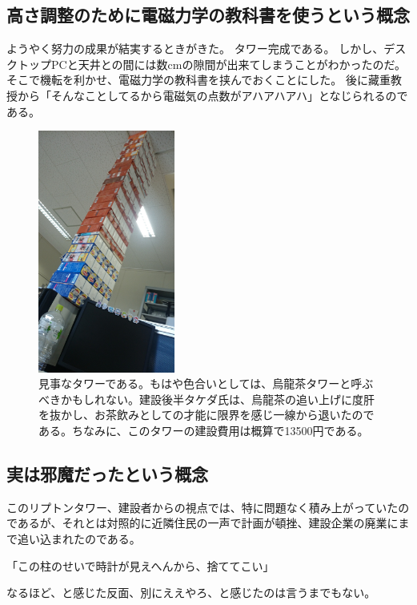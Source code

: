 \subsection{高さ調整のために電磁力学の教科書を使うという概念}
ようやく努力の成果が結実するときがきた。
タワー完成である。
しかし、デスクトップPCと天井との間には数cmの隙間が出来てしまうことがわかったのだ。
そこで機転を利かせ、電磁力学の教科書を挟んでおくことにした。
後に藏重教授から「そんなことしてるから電磁気の点数がアハアハアハ」となじられるのである。

\begin{figure}[h]
\centering
\includegraphics[width=0.4\textwidth]{./section/Shokuji/figures/LiptonTower_final.jpg}
  \caption{見事なタワーである。もはや色合いとしては、烏龍茶タワーと呼ぶべきかもしれない。建設後半タケダ氏は、烏龍茶の追い上げに度肝を抜かし、お茶飲みとしての才能に限界を感じ一線から退いたのである。ちなみに、このタワーの建設費用は概算で13500円である。}
\label{Fig:LiptonTower_final}
\end{figure}



\subsection{実は邪魔だったという概念}
このリプトンタワー、建設者からの視点では、特に問題なく積み上がっていたのであるが、それとは対照的に近隣住民の一声で計画が頓挫、建設企業の廃業にまで追い込まれたのである。\par
「この柱のせいで時計が見えへんから、捨ててこい」\par
なるほど、と感じた反面、別にええやろ、と感じたのは言うまでもない。


